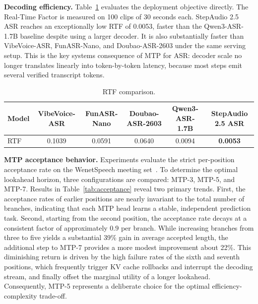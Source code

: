 \documentclass{llmxive}
\begin{document}
\textbf{Decoding efficiency.} Table~\ref{tab:rtf} evaluates the deployment objective directly. The Real-Time Factor is measured on 100 clips of 30 seconds each. StepAudio 2.5 ASR reaches an exceptionally low RTF of 0.0053, faster than the Qwen3-ASR-1.7B baseline despite using a larger decoder. It is also substantially faster than VibeVoice-ASR, FunASR-Nano, and Doubao-ASR-2603 under the same serving setup. This is the key systems consequence of MTP for ASR: decoder scale no longer translates linearly into token-by-token latency, because most steps emit several verified transcript tokens.

\begin{table}[htb]
\centering
\small
\begin{tabular}{lccccc}
\toprule
Model & VibeVoice-ASR & FunASR-Nano & Doubao-ASR-2603 & Qwen3-ASR-1.7B & StepAudio 2.5 ASR \\
\midrule
RTF & 0.1039 & 0.0591 & 0.0640 & 0.0094 & \textbf{0.0053} \\
\bottomrule
\end{tabular}
\caption{RTF comparison.}
\label{tab:rtf}
\end{table}

\textbf{MTP acceptance behavior.} Experiments evaluate the strict per-position acceptance rate on the WenetSpeech meeting set~\citep{zhang2022wenetspeech}. To determine the optimal lookahead horizon, three configurations are compared: MTP-3, MTP-5, and MTP-7. Results in Table~\ref{tab:acceptance} reveal two primary trends. First, the acceptance rates of earlier positions are nearly invariant to the total number of branches, indicating that each MTP head learns a stable, independent prediction task. Second, starting from the second position, the acceptance rate decays at a consistent factor of approximately $0.9$ per branch. While increasing branches from three to five yields a substantial 39\% gain in average accepted length, the additional step to MTP-7 provides a more modest improvement about 22\%. This diminishing return is driven by the high failure rates of the sixth and seventh positions, which frequently trigger KV cache rollbacks and interrupt the decoding stream, and finally offset the marginal utility of a longer lookahead. Consequently, MTP-5 represents a deliberate choice for the optimal efficiency-complexity trade-off.
\end{document}
